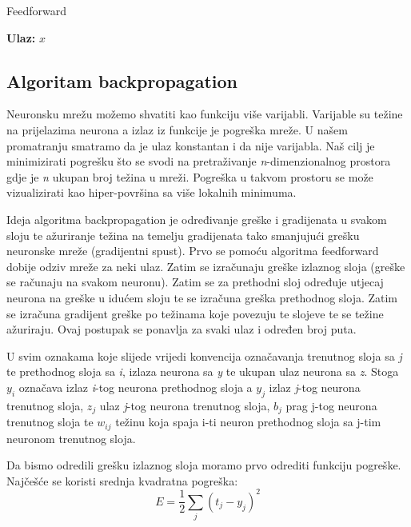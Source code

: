 \documentclass[times, utf8, zavrsni, numeric]{fer}
\begin{document}
\renewcommand{\algorithmicfor}{\textbf{za}}
\renewcommand{\algorithmicend}{\textbf{kraj}}
\renewcommand{\algorithmicwhile}{\textbf{dok}}
\renewcommand{\algorithmicdo}{\textbf{radi}}
\begin{algorithm}
\caption{Feedforward}
\label{alg:feedforward}
\begin{algorithmic}
\STATE \textbf{Ulaz:} $x$
\ENDFOR
\end{algorithmic}
\end{algorithm}
\subsection{Algoritam backpropagation}
Neuronsku mrežu možemo shvatiti kao funkciju više varijabli. Varijable su težine na prijelazima neurona a izlaz iz funkcije je pogreška mreže. U našem promatranju smatramo da je ulaz konstantan i da nije varijabla. Naš cilj je minimizirati pogrešku što se svodi na pretraživanje \textit{n}-dimenzionalnog prostora gdje je \textit{n} ukupan broj težina u mreži. Pogreška u takvom prostoru se može vizualizirati kao hiper-površina sa više lokalnih minimuma.

Ideja algoritma backpropagation je određivanje greške i gradijenata u svakom sloju te ažuriranje težina na temelju gradijenata tako smanjujući grešku neuronske mreže (gradijentni spust). Prvo se pomoću algoritma feedforward dobije odziv mreže za neki ulaz. Zatim se izračunaju greške izlaznog sloja (greške se računaju na svakom neuronu). Zatim se za prethodni sloj određuje utjecaj neurona na greške u idućem sloju te se izračuna greška prethodnog sloja. Zatim se izračuna gradijent greške po težinama koje povezuju te slojeve te se težine ažuriraju. Ovaj postupak se ponavlja za svaki ulaz i određen broj puta.

U svim oznakama koje slijede vrijedi konvencija označavanja trenutnog sloja sa \textit{j} te prethodnog sloja sa \textit{i}, izlaza neurona sa \textit{y} te ukupan ulaz neurona sa \textit{z}. Stoga $y_{i}$ označava izlaz \textit{i}-tog neurona prethodnog sloja a $y_{j}$ izlaz \textit{j}-tog neurona trenutnog sloja, $z_{j}$ ulaz \textit{j}-tog neurona trenutnog sloja, $b_j$ prag j-tog neurona trenutnog sloja te $w_{ij}$ težinu koja spaja i-ti neuron prethodnog sloja sa j-tim neuronom trenutnog sloja.

Da bismo odredili grešku izlaznog sloja moramo prvo odrediti funkciju pogreške. Najčešće se koristi srednja kvadratna pogreška:
\begin{equation}\label{eq:sr-kv-pogr}
  E = \frac{1}{2}\sum_j(t_j-y_j)^2
\end{equation}
\end{document}
